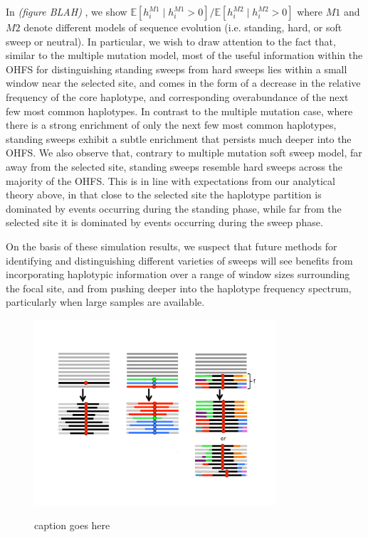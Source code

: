 \documentclass[a4paper,10pt]{article}
\newcommand{\jb}[1]{{\it\color{blue} (#1)} }
\begin{document}
In \jb{figure BLAH}, we show $\mathbb{E}[h_i^{M1} \mid h_i^{M1} > 0]/\mathbb{E}[h_i^{M2} \mid h_i^{M2} > 0]$ where $M1$ and $M2$ denote different models of sequence evolution (i.e. standing, hard, or soft sweep or neutral). In particular, we wish to draw attention to the fact that, similar to the multiple mutation model, most of the useful information within the OHFS for distinguishing standing sweeps from hard sweeps lies within a small window near the selected site, and comes in the form of a decrease in the relative frequency of the core haplotype, and corresponding overabundance of the next few most common haplotypes. In contrast to the multiple mutation case, where there is a strong enrichment of only the next few most common haplotypes, standing sweeps exhibit a subtle enrichment that persists much deeper into the OHFS. We also observe that, contrary to multiple mutation soft sweep model, far away from the selected site, standing sweeps resemble hard sweeps across the majority of the OHFS. This is in line with expectations from our analytical theory above, in that close to the selected site the haplotype partition is dominated by events occurring during the standing phase, while far from the selected site it is dominated by events occurring during the sweep phase.

On the basis of these simulation results, we suspect that future methods for identifying and distinguishing different varieties of sweeps will see benefits from incorporating haplotypic information over a range of window sizes surrounding the focal site, and from pushing deeper into the haplotype frequency spectrum, particularly when large samples are available.

\begin{figure}
	\includegraphics[width = 0.8\textwidth]{../Paper_Figures/three_kinds_of_sweep.pdf} \label{cartoon_3_kinds}
	\caption{caption goes here}
\end{figure}
\end{document}
